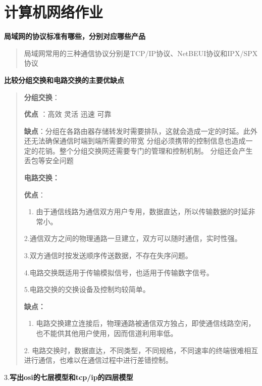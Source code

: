 \documentclass[
]{article}
\author{}
\date{}
\begin{document}
\hypertarget{ux8ba1ux7b97ux673aux7f51ux7edcux4f5cux4e1a}{%
\section{计算机网络作业}\label{ux8ba1ux7b97ux673aux7f51ux7edcux4f5cux4e1a}}

\textbf{局域网的协议标准有哪些，分别对应哪些产品}

\begin{quote}
局域网常用的三种通信协议分别是TCP/IP协议、NetBEUI协议和IPX/SPX协议
\end{quote}

\textbf{比较分组交换和电路交换的主要优缺点}

\begin{quote}
\textbf{分组交换}：

\textbf{优点} ：高效 灵活 迅速 可靠

\textbf{缺点}：分组在各路由器存储转发时需要排队，这就会造成一定的时延。此外还无法确保通信时端到端所需要的带宽
分组必须携带的控制信息也造成一定的花销。整个分组交换网还需要专门的管理和控制机制。
分组还会产生丢包等安全问题

\textbf{电路交换：}

\textbf{优点}：

\begin{enumerate}
\def\labelenumi{\arabic{enumi}.}
\item
  由于通信线路为通信双方用户专用，数据直达，所以传输数据的时延非常小。
\end{enumerate}

2.通信双方之间的物理通路一旦建立，双方可以随时通信，实时性强。

3.双方通信时按发送顺序传送数据，不存在失序问题。

4.电路交换既适用于传输模拟信号，也适用于传输数字信号。

5.电路交换的交换设备及控制均较简单。

\textbf{缺点：}

\begin{enumerate}
\def\labelenumi{\arabic{enumi}.}
\item
  电路交换建立连接后，物理通路被通信双方独占，即使通信线路空闲，也不能供其他用户使用，因而信道利用率低。
\end{enumerate}

2.
电路交换时，数据直达，不同类型，不同规格，不同速率的终端很难相互进行通信，也难以在通信过程中进行差错控制。
\end{quote}

3.\textbf{写出osi的七层模型和tcp/ip的四层模型}
\end{document}
